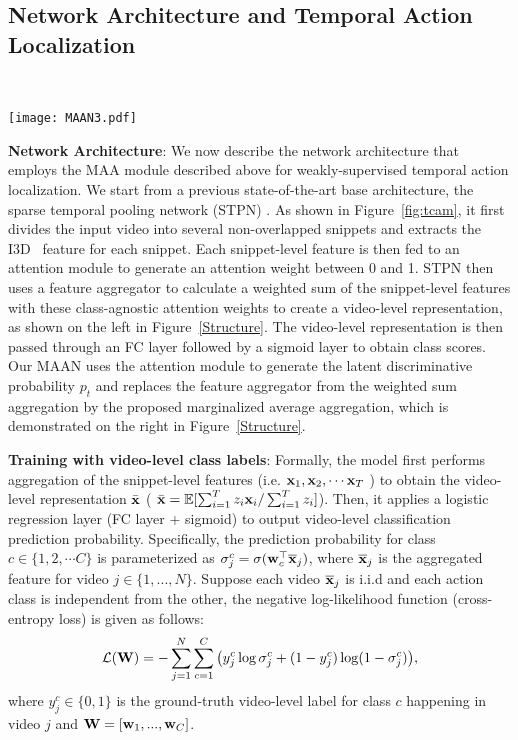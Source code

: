 \documentclass{article} \usepackage{iclr2019_conference,times}
\begin{document}
\subsection{Network Architecture and Temporal Action Localization}~\label{network_architecture}


\begin{figure*}[t!]
\centering
\texttt{[image: MAAN3.pdf]}\vspace{-4mm}
\caption{The feature aggregators used in STPN and MAAN.}
\vspace{-2mm}
\label{Structure}
\end{figure*}
\vspace{-6mm}

\textbf{Network Architecture}: We now describe the network architecture that employs the MAA module described above for weakly-supervised temporal action localization. We start from a previous state-of-the-art base architecture, the sparse temporal pooling network (STPN) \citep{nguyen2017weakly}. As shown in Figure~\ref{fig:tcam}, it first divides the input video into several non-overlapped snippets and extracts the I3D~\citep{I3D} feature for each snippet. Each snippet-level feature is then fed to an attention module to generate an attention weight between 0 and 1. STPN then uses a feature aggregator to calculate a weighted sum of the snippet-level features with these class-agnostic attention weights to create a video-level representation, as shown on the left in Figure~\ref{Structure}. The video-level representation is then passed through an FC layer followed by a sigmoid layer to obtain class scores. Our MAAN uses the attention module to generate the latent discriminative probability $ p_{t} $ and replaces the feature aggregator from the weighted sum aggregation by the proposed marginalized average aggregation, which is demonstrated on the right in Figure~\ref{Structure}.


\textbf{Training with video-level class labels}: Formally, the model first performs aggregation of the snippet-level features (i.e. ${\bf{x}}_1,{\bf x}_2,\cdots {\bf{x}}_T$ ) to obtain the video-level representation $\bar {\bf{x}} $ ( $\bar {\bf{x}} = \mathbb{E}[{\sum\nolimits_{i = 1}^T {{z_i}} {{\bf{x}}_i}}/\sum\nolimits_{i=1}^T{{z_i}}] $). Then, it applies a logistic regression layer (FC layer + sigmoid) to output video-level classification prediction probability. Specifically, the prediction probability for class  $c \in \{1,2,\cdots C\}$ is parameterized as  $\sigma_j^c = \sigma({\bf{w}}_c^\top \overline{{\bf{x}}}_j)$, where $\overline{{\bf{x}}}_j$ is the aggregated feature for video $j \in \{1,...,N\}$. Suppose each video  $\overline{{\bf{x}}}_j$ is i.i.d and  each action class is independent from the other, the negative log-likelihood function (cross-entropy loss) is given as follows:
\begin{align}
\mathcal{L}({\bf{W} }) =  - \sum\limits_{j = 1}^N \sum\limits_{c = 1}^C   {\left( {y_j^c\log \sigma_j^c + (1 - y_j^c)\log (1 - \sigma_j^c)} \right)},
\end{align}
where $y^c_j \in \{0,1\}$ is the ground-truth video-level label for class $c$ happening in video $j$ and ${\bf{W}} =[{\bf{w}}_1,...,{\bf{w}}_C] $. 
\end{document}
